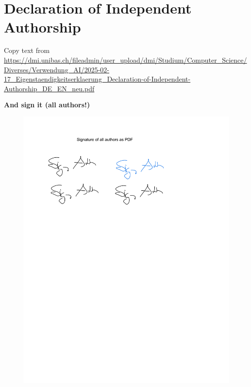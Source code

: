 \clearpage
\section{Declaration of Independent Authorship}\label{sec:integrity}

Copy text from \url{https://dmi.unibas.ch/fileadmin/user_upload/dmi/Studium/Computer_Science/Diverses/Verwendung_AI/2025-02-17_Eigenstaendigkeitserklaerung_Declaration-of-Independent-Authorship_DE_EN_neu.pdf}


\noindent\Large{\textbf{And sign it (all authors!)}}

\begin{figure}[b]
    \centering
    \includegraphics[width=1\textwidth, trim=0pt 500pt 0pt 50pt, clip]{images/example.pdf}
\end{figure}

